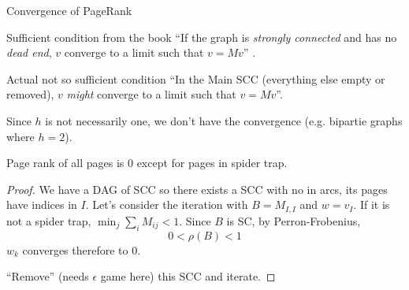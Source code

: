 \documentclass[10pt]{beamer}
\begin{document}
\begin{frame}[allowframebreaks]{Convergence of PageRank}
  \begin{block}{Sufficient condition from the book}
    ``If the graph is \emph{strongly connected} and has no \emph{dead end}, $v$ converge to a limit such that $v = Mv$''
    \cite[p.~185]{leskovec2014mining}.
  \end{block}
  \begin{block}{Actual not so sufficient condition}
    ``In the Main SCC (everything else empty or removed), $v$ \emph{might} converge to a limit such that $v = Mv$''.
  \end{block}
  Since $h$ is not necessarily one, we don't have the convergence (e.g. bipartie graphs where $h=2$).
  \framebreak

  Page rank of all pages is 0 except for pages in spider trap.
  \begin{proof}
    We have a DAG of SCC so there exists a SCC with no in arcs, its pages have indices in $I$.
    Let's consider the iteration with $B = M_{I,I}$ and $w=v_I$.
    If it is not a spider trap, $\min_j \sum_i M_{ij} < 1$.
    Since $B$ is SC, by Perron-Frobenius,
    \[ 0 < \rho(B) < 1 \]
    $w_k$ converges therefore to 0.

    ``Remove'' (needs $\epsilon$ game here) this SCC and iterate.
  \end{proof}
\end{frame}
\end{document}
